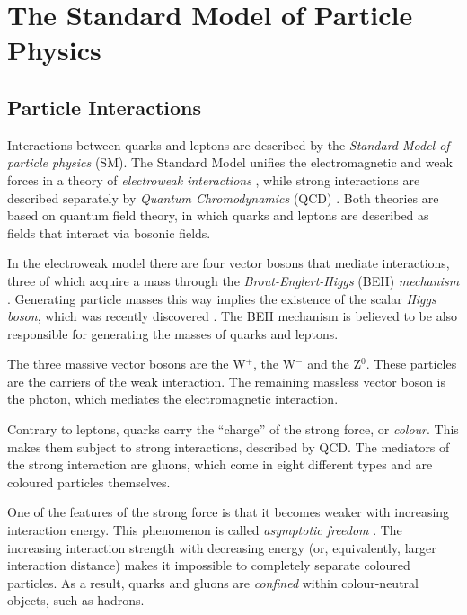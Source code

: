 \section{The Standard Model of Particle Physics}

\subsection{Particle Interactions}

Interactions between quarks and leptons are described by the \emph{Standard Model of particle physics} (SM). The Standard Model unifies
the electromagnetic and weak forces in a theory of \emph{electroweak interactions} \cite{Glashow:1961tr,*Weinberg:1967tq,*Salam:1968rm},
while strong interactions are described separately by \emph{Quantum Chromodynamics} (QCD) \cite{Fritzsch:1973pi}. Both theories are
based on quantum field theory, in which quarks and leptons are described as fields that interact via bosonic fields.

In the electroweak model there are four vector bosons that mediate interactions, three of which acquire a mass through the
\emph{Brout-Englert-Higgs} (BEH) \emph{mechanism} \cite{Englert:1964et,*Higgs:1964ia,*Higgs:1964pj,*Guralnik:1964eu}. Generating particle
masses this way implies the existence of the scalar \emph{Higgs boson}, which was recently discovered
\cite{Aad:2012tfa,*Chatrchyan:2012ufa}. The BEH mechanism is believed to be also responsible for generating the masses of quarks and
leptons.

The three massive vector bosons are the W$^+$, the W$^-$ and the Z$^0$. These particles are the carriers of the weak interaction. The
remaining massless vector boson is the photon, which mediates the electromagnetic interaction.

Contrary to leptons, quarks carry the ``charge'' of the strong force, or \emph{colour}. This makes them subject to strong interactions,
described by QCD. The mediators of the strong interaction are gluons, which come in eight different types and are coloured particles
themselves.

One of the features of the strong force is that it becomes weaker with increasing interaction energy. This phenomenon is called
\emph{asymptotic freedom} \cite{Gross:1973id,*Politzer:1973fx}. The increasing interaction strength with decreasing energy (or,
equivalently, larger interaction distance) makes it impossible to completely separate coloured particles. As a result, quarks and gluons
are \emph{confined} within colour-neutral objects, such as hadrons.

